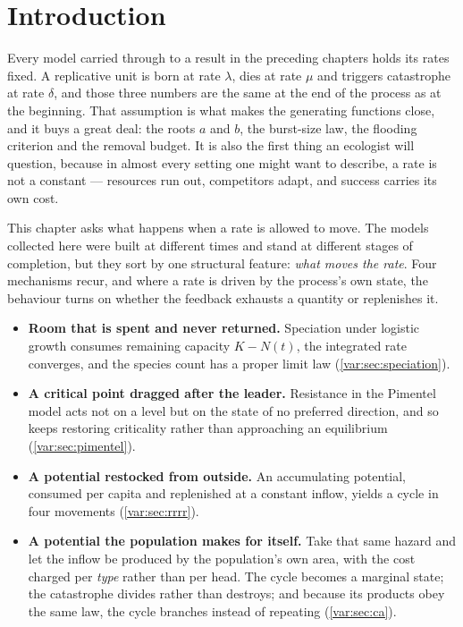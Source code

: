 
\section{Introduction}
\label{var:sec:introduction}

Every model carried through to a result in the preceding chapters holds its
rates fixed. A replicative unit is born at rate $\lambda$, dies at rate $\mu$
and triggers catastrophe at rate $\delta$, and those three numbers are the
same at the end of the process as at the beginning. That assumption is what
makes the generating functions close, and it buys a great deal: the roots $a$
and $b$, the burst-size law, the flooding criterion and the removal budget.
It is also the first thing an ecologist will question, because in almost
every setting one might want to describe, a rate is not a constant ---
resources run out, competitors adapt, and success carries its own cost.

This chapter asks what happens when a rate is allowed to move. The models
collected here were built at different times and stand at different stages of
completion, but they sort by one structural feature: \emph{what moves the
rate}. Four mechanisms recur, and where a rate is driven by the process's own
state, the behaviour turns on whether the feedback exhausts a quantity or
replenishes it.

\begin{itemize}[leftmargin=1.6em,itemsep=0.35em,topsep=0.35em]
\item \textbf{Room that is spent and never returned.} Speciation under
logistic growth consumes remaining capacity $K-N(t)$, the integrated rate
converges, and the species count has a proper limit law
(\cref{var:sec:speciation}).
\item \textbf{A critical point dragged after the leader.} Resistance in the
Pimentel model acts not on a level but on the state of no preferred
direction, and so keeps restoring criticality rather than approaching an
equilibrium (\cref{var:sec:pimentel}).
\item \textbf{A potential restocked from outside.} An accumulating potential,
consumed per capita and replenished at a constant inflow, yields a cycle in
four movements (\cref{var:sec:rrrr}).
\item \textbf{A potential the population makes for itself.} Take that same
hazard and let the inflow be produced by the population's own area, with the
cost charged per \emph{type} rather than per head. The cycle becomes a
marginal state; the catastrophe divides rather than destroys; and because its
products obey the same law, the cycle branches instead of repeating
(\cref{var:sec:ca}).
\end{itemize}

